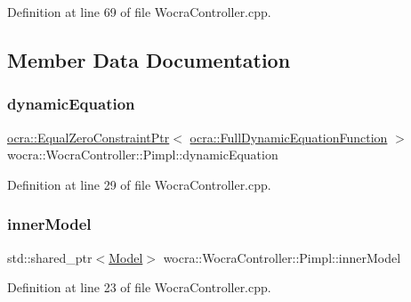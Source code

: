 Definition at line 69 of file Wocra\+Controller.\+cpp.



\subsection{Member Data Documentation}
\hypertarget{structwocra_1_1WocraController_1_1Pimpl_a1109652d5d4a11542cc5130713977b73}{}\label{structwocra_1_1WocraController_1_1Pimpl_a1109652d5d4a11542cc5130713977b73} 
\subsubsection{\texorpdfstring{dynamic\+Equation}{dynamicEquation}}
{\footnotesize\ttfamily \hyperlink{classocra_1_1EqualZeroConstraintPtr}{ocra\+::\+Equal\+Zero\+Constraint\+Ptr}$<$ \hyperlink{classocra_1_1FullDynamicEquationFunction}{ocra\+::\+Full\+Dynamic\+Equation\+Function} $>$ wocra\+::\+Wocra\+Controller\+::\+Pimpl\+::dynamic\+Equation}



Definition at line 29 of file Wocra\+Controller.\+cpp.

\hypertarget{structwocra_1_1WocraController_1_1Pimpl_a4fe5b4fd5e927bbf9c83bf10ffafc98f}{}\label{structwocra_1_1WocraController_1_1Pimpl_a4fe5b4fd5e927bbf9c83bf10ffafc98f} 
\subsubsection{\texorpdfstring{inner\+Model}{innerModel}}
{\footnotesize\ttfamily std\+::shared\+\_\+ptr$<$\hyperlink{classocra_1_1Model}{Model}$>$ wocra\+::\+Wocra\+Controller\+::\+Pimpl\+::inner\+Model}



Definition at line 23 of file Wocra\+Controller.\+cpp.

\hypertarget{structwocra_1_1WocraController_1_1Pimpl_a761307f74ee3b130993d589372164b98}{}\label{structwocra_1_1WocraController_1_1Pimpl_a761307f74ee3b130993d589372164b98} 
